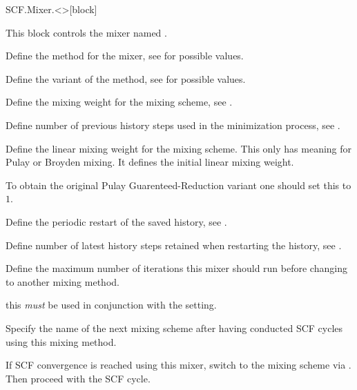 \begin{fdfentry}{SCF.Mixer.<>}[block]

  This block controls the mixer named \fdf*{<>}. 

  \begin{fdfoptions}

    \option[method]%
    Define the method for the mixer, see  for
    possible values.

    \option[variant]%
    Define the variant of the method, see  for
    possible values.

    \option[weight|w]%
    Define the mixing weight for the mixing scheme, see
    .

    \option[history]%
    Define number of previous history steps used in the minimization process, see
    .

    Define the linear mixing weight for the mixing scheme. This only
    has meaning for Pulay or Broyden mixing. It defines the initial
    linear mixing weight. 

    To obtain the original Pulay Guarenteed-Reduction variant one
    should set this to $1$.

    \option[restart]%
    Define the periodic restart of the saved history, see
    .

    Define number of latest history steps retained when restarting the
    history, see .

    \option[iterations]%
    Define the maximum number of iterations this mixer should run
    before changing to another mixing method.

    \note this \emph{must} be used in conjunction with the  setting.

    Specify the name of the next mixing scheme after having conducted
     SCF cycles using this mixing method.

    If SCF convergence is reached using this mixer, switch to the
    mixing scheme via \fdf*{<>}. Then proceed with the SCF cycle.


\end{fdfoptions}
\end{fdfentry}
